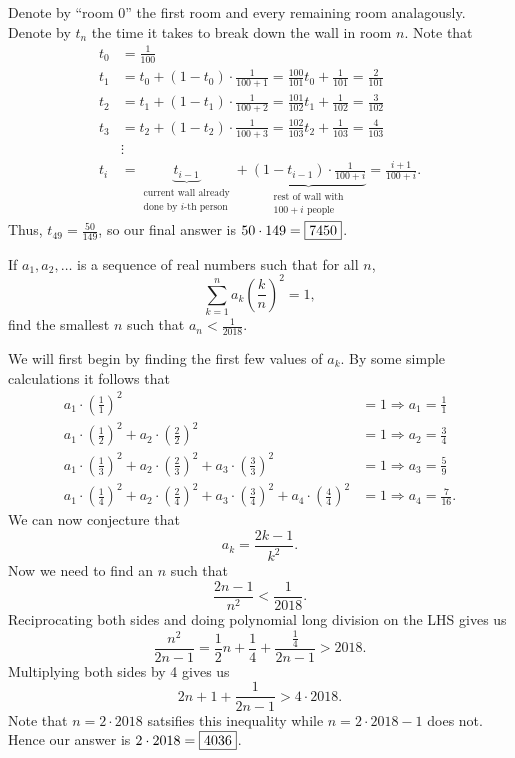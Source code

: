 \documentclass[letterpaper,oneside]{scrartcl}
\begin{document}
\begin{soln}
  Denote by ``room 0'' the first room and every remaining room analagously. Denote by \(t_n\) the time it takes to break down the wall in room \(n\). Note that 
  \begin{align*}
    t_0 &= \frac{1}{100} \\
    t_1 &= t_0 + (1-t_0)\cdot\frac{1}{100+1} = \frac{100}{101}t_0+\frac{1}{101} = \frac{2}{101}\\
    t_2 &= t_1 + (1-t_1)\cdot\frac{1}{100+2} = \frac{101}{102}t_1+\frac{1}{102} = \frac{3}{102}\\
    t_3 &= t_2 + (1-t_2)\cdot\frac{1}{100+3} = \frac{102}{103}t_2+\frac{1}{103} = \frac{4}{103}\\
    &\vdots \\
    t_i &= \underbrace{t_{i-1}}_{\substack{\text{current wall already}\\\text{done by } i\text{-th person}}} + \underbrace{(1-t_{i-1})\cdot\frac{1}{100+i}}_{\substack{\text{rest of wall with}\\100 + i \text{ people}}} = \frac{i+1}{100+i}. 
  \end{align*}
  Thus, \(t_{49} = \frac{50}{149}\), so our final answer is \(50\cdot149 = \fbox{7450}\).
\end{soln}
\begin{problem*}
  If \(a_1,a_2,\dots\) is a sequence of real numbers such that for all \(n\), \[\sum_{k=1}^n a_k\left(\frac{k}{n}\right)^2=1,\] find the smallest \(n\) such that \(a_n < \frac{1}{2018}\).
\end{problem*}
\begin{soln}
  We will first begin by finding the first few values of \(a_k\). By some simple calculations it follows that
  \begin{align*}
    a_1\cdot\left(\tfrac{1}{1}\right)^2&= 1 \Longrightarrow a_1 = \tfrac{1}{1}\\
    a_1\cdot\left(\tfrac{1}{2}\right)^2+a_2\cdot\left(\tfrac{2}{2}\right)^2&= 1 \Longrightarrow a_2 = \tfrac{3}{4}\\
    a_1\cdot\left(\tfrac{1}{3}\right)^2+a_2\cdot\left(\tfrac{2}{3}\right)^2+a_3\cdot\left(\tfrac{3}{3}\right)^2 &= 1 \Longrightarrow a_3 = \tfrac{5}{9}\\
    a_1\cdot\left(\tfrac{1}{4}\right)^2+a_2\cdot\left(\tfrac{2}{4}\right)^2+a_3\cdot\left(\tfrac{3}{4}\right)^2 + a_4\cdot\left(\tfrac{4}{4}\right)^2&= 1 \Longrightarrow a_4 = \tfrac{7}{16}.
  \end{align*}
  We can now conjecture that
  \[a_k = \frac{2k-1}{k^2}.\]
  Now we need to find an \(n\) such that
  \[\frac{2n-1}{n^2}<\frac{1}{2018}.\]
  Reciprocating both sides and doing polynomial long division on the LHS gives us
  \[\frac{n^2}{2n-1} = \frac{1}{2}n+\frac{1}{4}+\frac{\tfrac14}{2n-1}>2018.\]
  Multiplying both sides by 4 gives us 
  \[2n+1+\frac{1}{2n-1}>4\cdot2018.\]
  Note that \(n=2\cdot2018\) satsifies this inequality while \(n=2\cdot2018-1\) does not. Hence our answer is \(2\cdot2018 = \fbox{4036}\).
\end{soln}
\end{document}
